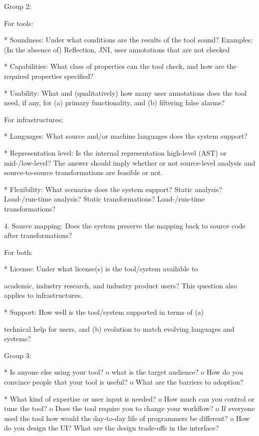 {Group 2:

For tools:

    * Soundness: Under what conditions are the results of the tool sound? Examples: (In the absence of) Reflection, JNI, user annotations that are not checked 

    * Capabilities: What class of properties can the tool check, and how are the required properties specified? 

    * Usability: What and (qualitatively) how many user annotations does the tool need, if any, for (a) primary functionality, and (b) filtering false alarms? 

For infrastructures:

    * Languages: What source and/or machine languages does the system support? 

    * Representation level: Is the internal representation high-level (AST) or mid-/low-level? The answer should imply whether or not source-level analysis and source-to-source transformations are feasible or not. 

    * Flexibility: What scenarios does the system support? Static analysis? Load-/run-time analysis? Static transformations? Load-/run-time transformations? 

4. Source mapping: Does the system preserve the mapping back to source code after transformations?


For both:

    * License: Under what license(s) is the tool/system available to 

academic, industry research, and industry product users? This question also applies to infrastructures.

    * Support: How well is the tool/system supported in terms of (a) 

technical help for users, and (b) evolution to match evolving languages and systems?

Group 3:

    * Is anyone else using your tool?
          o what is the target audience?
          o How do you convince people that your tool is useful?
          o What are the barriers to adoption? 

    * What kind of expertise or user input is needed?
          o How much can you control or tune the tool?
          o Does the tool require you to change your workflow?
          o If everyone used the tool how would the day-to-day life of programmers be different?
          o How do you design the UI? What are the design trade-offs in the interface? 

}
